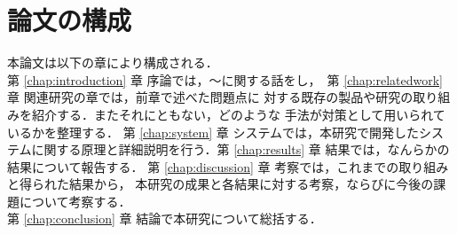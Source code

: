 \newpage

\section{論文の構成}
本論文は以下の章により構成される．\\

第 \ref{chap:introduction} 章 序論では，〜に関する話をし，\
第 \ref{chap:relatedwork} 章 関連研究の章では，前章で述べた問題点に
対する既存の製品や研究の取り組みを紹介する．またそれにともない，どのような
手法が対策として用いられているかを整理する．
第 \ref{chap:system} 章 システムでは，本研究で開発したシステムに関する原理と詳細説明を行う．第 \ref{chap:results} 章 結果では，なんらかの結果について報告する．
第 \ref{chap:discussion} 章 考察では，これまでの取り組みと得られた結果から，
本研究の成果と各結果に対する考察，ならびに今後の課題について考察する．\\
第 \ref{chap:conclusion} 章 結論で本研究について総括する．\\

\newpage

